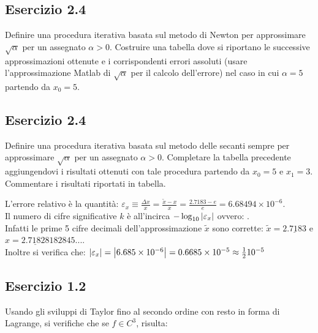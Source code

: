 \TODO



	\subsection{Esercizio 2.4}

Definire una procedura iterativa basata sul metodo di Newton per approssimare $\sqrt{\alpha}$ per un assegnato $\alpha > 0$. Costruire una tabella dove
si riportano le successive approssimazioni ottenute e i corrispondenti errori assoluti (usare l’approssimazione Matlab di $\sqrt{\alpha}$ per il calcolo dell'errore) nel caso in cui $\alpha = 5$ partendo da $x_0 = 5$.

\TODO



	\subsection{Esercizio 2.4}

Definire una procedura iterativa basata sul metodo delle secanti sempre per approssimare $\sqrt{\alpha}$ per un assegnato $\alpha > 0$. Completare la tabella
precedente aggiungendovi i risultati ottenuti con tale procedura partendo da $x_0 = 5$ e $x_1=3$. Commentare i risultati riportati in tabella.



L'errore relativo è la quantità: $\varepsilon_x \equiv \frac{\Delta{x}}{x}=\frac{\tilde{x}-x}{x} = \frac{2.7183-e}{e} = 6.68494 \times 10^{-6}$.\\
Il numero di cifre significative $k$ è all'incirca $-\log_{10}{\abs{\varepsilon_x}}$ ovvero: 
.\\
Infatti le prime 5 cifre decimali dell'approssimazione $\tilde{x}$ sono corrette: $\tilde{x}  =\underline{2.7183}$ e $x = \underline{2.71828}182845...$.\\
Inoltre si verifica che: $\abs{\varepsilon_x} = \abs{6.685 \times 10^{-6}} = 0.6685 \times 10^{-5} \approx \frac{1}{2}10^{-5}$


	\subsection{Esercizio 1.2}
	
	Usando gli sviluppi di Taylor fino al secondo ordine con resto in forma di Lagrange, si verifiche che se $f \in C^3$, risulta:
	
